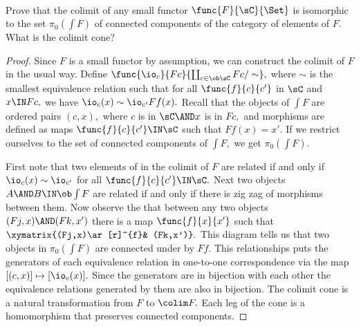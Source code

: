 \documentclass[main.tex]{subfiles}
\begin{document}
	
	
	\paragraph{}
	\begin{exercise}
		Prove that the colimit of any small functor $ \func{F}{\sC}{\Set} $ is
		isomorphic to the set $ \pi_0(\int F) $ of connected components of the 
		category of elements of $ F. $ What is the colimit cone?
	\end{exercise}
	
	\begin{proof}
		Since $ F $ is a small functor by assumption, we can construct the 
		colimit of
		$ F $ in the usual way. Define $ \func{\io_c}{Fc}{\coprod_{c\in 
			\ob\sC}Fc/\sim},$ where $\sim $ is the smallest equivalence 
			relation 
		such that for all $\func{f}{c}{c'} $ in $ \sC $ and $ x\IN Fc,$ we have 
		$\io_c(x)\sim\io_{c'}Ff(x).$  
		Recall that the objects of $\int F$ are ordered pairs $(c,x),$ where 
		$c$ is in $ \sC \AND 
		x$ is in $ Fc, $ and morphisms are defined as maps
		 $ \func{f}{c}{c'} \IN \sC$ such that $ Ff(x)=x'. $ 
		 If we restrict ourselves to the set of connected components of 
		 $ \int F, $ we get $ \pi_0(\int F). $
		 
		 First note that two elements of in the colimit of $ F $ are 
		 related if and only if $ \io_c(x)\sim \io_{c'}$ for all $ 
		 \func{f}{c}{c'} \IN\sC.$ Next two objects $A\AND B\IN \ob\int F $ are 
		 related if and only if there is zig zag of morphisms between them.
		 Now observe the that between any two objects $ (Fj,x)\AND (Fk,x') $
		 there is a map $ \func{f}{x}{x'} $ such that
		 $\xymatrix{(Fj,x)\ar[r]^{f}& (Fk,x')}.$
		This diagram tells us that two objects in $\pi_0(\int F)$
		are connected under by $Ff.$ This relationships puts the 
		generators of each equivalence relation in one-to-one correspondence
		via the map $ [(c,x)]\mapsto [\io_c(x)]. $ Since the generators
		are in bijection with each other the equivalence relations
		generated by them are also in bijection. The colimit cone is a 
		natural transformation from $ F $ to $ \colim F.$ Each leg of the
		cone is a homomorphism that preserves connected components. 
		\end{proof}
	
\end{document}
